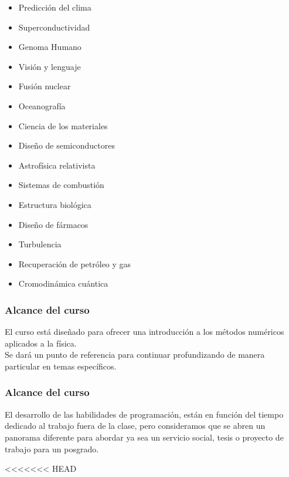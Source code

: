 \begin{frame}
\fontsize{14}{14}\selectfont
\begin{multicols}{2}
\begin{itemize}[<+->]
	\item Predicción del clima
	\item Superconductividad
	\item Genoma Humano
	\item Visión y lenguaje
	\item Fusión nuclear
	\item Oceanografía
	\item Ciencia de los materiales
	\item Diseño de semiconductores
	\item Astrofísica relativista
	\item Sistemas de combustión
	\item Estructura biológica
	\item Diseño de fármacos
	\item Turbulencia
	\item Recuperación de petróleo y gas
	\item Cromodinámica cuántica
\end{itemize}
\end{multicols}
\end{frame}
\begin{frame}
\frametitle{Alcance del curso}
El curso está diseñado para ofrecer una introducción a los métodos numéricos aplicados a la física.
\\
\medskip
Se dará un punto de referencia para continuar profundizando de manera particular en temas específicos. 
\end{frame}
\begin{frame}
\frametitle{Alcance del curso}
El desarrollo de las habilidades de programación, están en función del tiempo dedicado al trabajo fuera de la clase, pero consideramos que se abren un panorama diferente para abordar ya sea un servicio social, tesis o proyecto de trabajo para un posgrado.
\end{frame}
<<<<<<< HEAD
